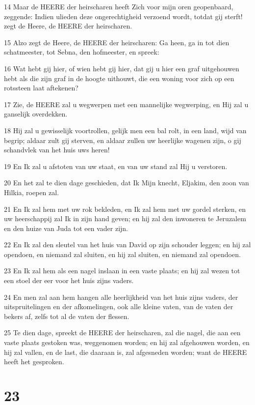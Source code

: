 \par 14 Maar de HEERE der heirscharen heeft Zich voor mijn oren geopenbaard, zeggende: Indien ulieden deze ongerechtigheid verzoend wordt, totdat gij sterft! zegt de Heere, de HEERE der heirscharen.
\par 15 Alzo zegt de Heere, de HEERE der heirscharen: Ga heen, ga in tot dien schatmeester, tot Sebna, den hofmeester, en spreek:
\par 16 Wat hebt gij hier, of wien hebt gij hier, dat gij u hier een graf uitgehouwen hebt als die zijn graf in de hoogte uithouwt, die een woning voor zich op een rotssteen laat aftekenen?
\par 17 Zie, de HEERE zal u wegwerpen met een mannelijke wegwerping, en Hij zal u ganselijk overdekken.
\par 18 Hij zal u gewisselijk voortrollen, gelijk men een bal rolt, in een land, wijd van begrip; aldaar zult gij sterven, en aldaar zullen uw heerlijke wagenen zijn, o gij schandvlek van het huis uws heren!
\par 19 En Ik zal u afstoten van uw staat, en van uw stand zal Hij u verstoren.
\par 20 En het zal te dien dage geschieden, dat Ik Mijn knecht, Eljakim, den zoon van Hilkia, roepen zal.
\par 21 En Ik zal hem met uw rok bekleden, en Ik zal hem met uw gordel sterken, en uw heerschappij zal Ik in zijn hand geven; en hij zal den inwoneren te Jeruzalem en den huize van Juda tot een vader zijn.
\par 22 En Ik zal den sleutel van het huis van David op zijn schouder leggen; en hij zal opendoen, en niemand zal sluiten, en hij zal sluiten, en niemand zal opendoen.
\par 23 En Ik zal hem als een nagel inslaan in een vaste plaats; en hij zal wezen tot een stoel der eer voor het huis zijns vaders.
\par 24 En men zal aan hem hangen alle heerlijkheid van het huis zijns vaders, der uitspruitelingen en der afkomelingen, ook alle kleine vaten, van de vaten der bekers af, zelfs tot al de vaten der flessen.
\par 25 Te dien dage, spreekt de HEERE der heirscharen, zal die nagel, die aan een vaste plaats gestoken was, weggenomen worden; en hij zal afgehouwen worden, en hij zal vallen, en de last, die daaraan is, zal afgesneden worden; want de HEERE heeft het gesproken.

\chapter{23}

